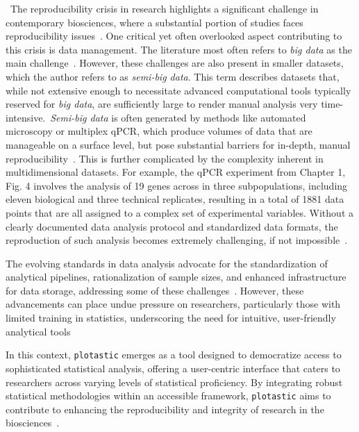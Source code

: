 \
The reproducibility crisis in research highlights a significant challenge in
contemporary biosciences, where a substantial portion of studies faces
reproducibility issues~\cite{begleyReproducibilityScienceImproving2015}. One
critical yet often overlooked aspect contributing to this crisis is data
management. The literature most often refers to \textit{big data} as the main
challenge~\cite{gomez-cabreroDataIntegrationEra2014}. However, these challenges
are also present in smaller datasets, which the author refers to as
\textit{semi-big data}. This term describes datasets that, while not extensive
enough to necessitate advanced computational tools typically reserved for
\textit{big data}, are sufficiently large to render manual analysis very
time-intensive.~\textit{Semi-big data} is often generated by methods like
automated microscopy or multiplex qPCR, which produce volumes of data that are
manageable on a surface level, but pose substantial barriers for in-depth,
manual reproducibility~\cite{bustinReproducibilityBiomedicalResearch2014}. This
is further complicated by the complexity inherent in multidimensional datasets.
For example, the qPCR experiment from Chapter 1, Fig. 4 involves the analysis of
19 genes across in three subpopulations, including eleven biological and three
technical replicates, resulting in a total of 1881 data points that are all
assigned to a complex set of experimental variables. Without a clearly
documented data analysis protocol and standardized data formats, the
reproduction of such analysis becomes extremely challenging, if not
impossible~\cite{bustinReproducibilityBiomedicalResearch2014}.


The evolving standards in data analysis advocate for the standardization of
analytical pipelines, rationalization of sample sizes, and enhanced
infrastructure for data storage, addressing some of these
challenges~\cite{goodmanWhatDoesResearch2016,wilkinsonFAIRGuidingPrinciples2016}.
However, these advancements can place undue pressure on researchers,
particularly those with limited training in statistics, underscoring the need
for intuitive, user-friendly analytical
tools~\cite{gosselinInsufficientTransparencyStatistical2021,armstrongWhenUseBonferroni2014,gomez-lopezPrecisionMedicineNeeds2019}

In this context, \texttt{plotastic} emerges as a tool designed to democratize access to
sophisticated statistical analysis, offering a user-centric interface that
caters to researchers across varying levels of statistical proficiency. By
integrating robust statistical methodologies within an accessible framework,
\texttt{plotastic} aims to contribute to enhancing the reproducibility and
integrity of research in the biosciences~\cite{gomez-cabreroDataIntegrationEra2014}.



